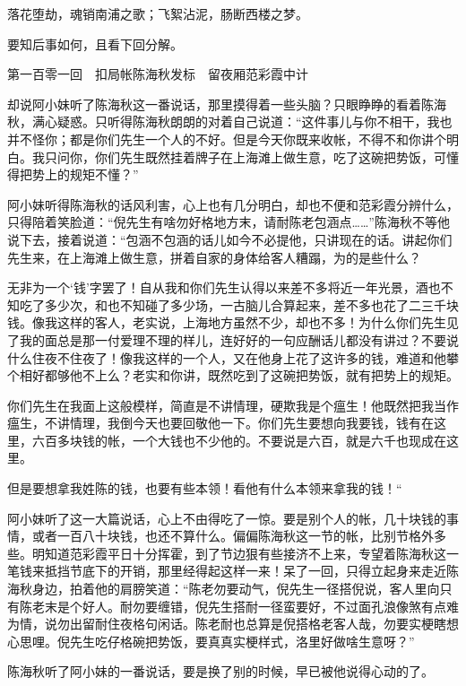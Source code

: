\documentclass[12pt,UTF8]{ctexbook}
\begin{document}
{{{落花堕劫，魂销南浦之歌；飞絮沾泥，肠断西楼之梦。

要知后事如何，且看下回分解。





第一百零一回　扣局帐陈海秋发标　留夜厢范彩霞中计





却说阿小妹听了陈海秋这一番说话，那里摸得着一些头脑？只眼睁睁的看着陈海秋，满心疑惑。只听得陈海秋朗朗的对着自己说道：“这件事儿与你不相干，我也并不怪你；都是你们先生一个人的不好。但是今天你既来收帐，不得不和你讲个明白。我只问你，你们先生既然挂着牌子在上海滩上做生意，吃了这碗把势饭，可懂得把势上的规矩不懂？”

阿小妹听得陈海秋的话风利害，心上也有几分明白，却也不便和范彩霞分辨什么，只得陪着笑脸道：“倪先生有啥勿好格地方末，请耐陈老包涵点……”陈海秋不等他说下去，接着说道：“包涵不包涵的话儿如今不必提他，只讲现在的话。讲起你们先生来，在上海滩上做生意，拼着自家的身体给客人糟蹋，为的是些什么？

无非为一个‘钱’字罢了！自从我和你们先生认得以来差不多将近一年光景，酒也不知吃了多少次，和也不知碰了多少场，一古脑儿合算起来，差不多也花了二三千块钱。像我这样的客人，老实说，上海地方虽然不少，却也不多！为什么你们先生见了我的面总是那一付爱理不理的样儿，连好好的一句应酬话儿都没有讲过？不要说什么住夜不住夜了！像我这样的一个人，又在他身上花了这许多的钱，难道和他攀个相好都够他不上么？老实和你讲，既然吃到了这碗把势饭，就有把势上的规矩。

你们先生在我面上这般模样，简直是不讲情理，硬欺我是个瘟生！他既然把我当作瘟生，不讲情理，我倒今天也要回敬他一下。你们先生要想向我要钱，钱有在这里，六百多块钱的帐，一个大钱也不少他的。不要说是六百，就是六千也现成在这里。

但是要想拿我姓陈的钱，也要有些本领！看他有什么本领来拿我的钱！“

阿小妹听了这一大篇说话，心上不由得吃了一惊。要是别个人的帐，几十块钱的事情，或者一百八十块钱，也还不算什么。偏偏陈海秋这一节的帐，比别节格外多些。明知道范彩霞平日十分挥霍，到了节边狠有些接济不上来，专望着陈海秋这一笔钱来抵挡节底下的开销，那里经得起这样一来！呆了一回，只得立起身来走近陈海秋身边，拍着他的肩膀笑道：“陈老勿要动气，倪先生一径搭倪说，客人里向只有陈老末是个好人。耐勿要缠错，倪先生搭耐一径蛮要好，不过面孔浪像煞有点难为情，说勿出留耐住夜格句闲话。陈老耐也总算是倪搭格老客人哉，勿要实梗瞎想心思哩。倪先生吃仔格碗把势饭，要真真实梗样式，洛里好做啥生意呀？”

陈海秋听了阿小妹的一番说话，要是换了别的时候，早已被他说得心动的了。

}}}
\end{document}
